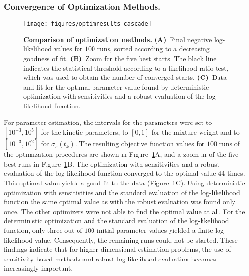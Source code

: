 \documentclass{llncs}
\begin{document}
\subsubsection{Convergence of Optimization Methods.}
\begin{figure}[tb]
\centering
\texttt{[image: figures/optimresults\_cascade]}
\caption{\color{revcol}\textbf{Comparison of optimization methods.} \textbf{(A)}~Final negative log-likelihood values for $100$ runs, sorted according to a decreasing goodness of fit. \textbf{(B)}~Zoom for the five best starts. The black line indicates the statistical threshold according to a likelihood ratio test, which was used to obtain the number of converged starts. \textbf{(C)}~Data and fit for the optimal parameter value found by deterministic optimization with sensitivities and a robust evaluation of the log-likelihood function.}\label{fig:optimresults_cascade}
\end{figure}
For parameter estimation, the intervals for the parameters were set to $[10^{-3},10^{5}]$ for the kinetic parameters, to $[0,1]$ for the mixture weight and to $[10^{-3},10^{2}]$ for $\sigma_{s}(t_k)$. The resulting objective function values for $100$ runs of the optimization procedures are shown in Figure~\ref{fig:optimresults_cascade}A, and a zoom in of the five best runs in Figure~\ref{fig:optimresults_cascade}B. The optimization with sensitivities and a robust evaluation of the log-likelihood function converged to the optimal value $44$ times. This optimal value yields a good fit to the data (Figure~\ref{fig:optimresults_cascade}C). Using deterministic optimization with sensitivities and the standard evaluation of the log-likelihood function the same optimal value as with the robust evaluation was found only once. The other optimizers were not able to find the optimal value at all. For the deterministic optimization and the standard evaluation of the log-likelihood function, only three out of $100$ initial parameter values yielded a finite log-likelihood value. Consequently, the remaining runs could not be started. These findings indicate that for higher-dimensional estimation problems, the use of sensitivity-based methods and robust log-likelihood evaluation becomes increasingly important. 
\end{document}
